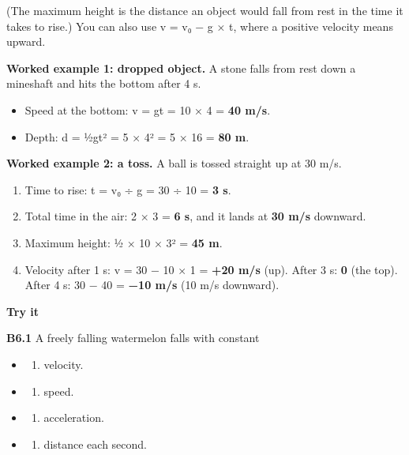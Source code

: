 \documentclass[
]{article}
\providecommand{\tightlist}{%
  \setlength{\itemsep}{0pt}\setlength{\parskip}{0pt}}
\begin{document}
(The maximum height is the distance an object would fall from rest in
the time it takes to rise.) You can also use v = v₀ − g × t, where a
positive velocity means upward.

\textbf{Worked example 1: dropped object.} A stone falls from rest down
a mineshaft and hits the bottom after 4 s.

\begin{itemize}
\tightlist
\item
  Speed at the bottom: v = gt = 10 × 4 = \textbf{40 m/s}.
\item
  Depth: d = ½gt² = 5 × 4² = 5 × 16 = \textbf{80 m}.
\end{itemize}

\textbf{Worked example 2: a toss.} A ball is tossed straight up at 30
m/s.

\begin{enumerate}
\def\labelenumi{\arabic{enumi}.}
\tightlist
\item
  Time to rise: t = v₀ ÷ g = 30 ÷ 10 = \textbf{3 s}.
\item
  Total time in the air: 2 × 3 = \textbf{6 s}, and it lands at
  \textbf{30 m/s} downward.
\item
  Maximum height: ½ × 10 × 3² = \textbf{45 m}.
\item
  Velocity after 1 s: v = 30 − 10 × 1 = \textbf{+20 m/s} (up). After 3
  s: \textbf{0} (the top). After 4 s: 30 − 40 = \textbf{−10 m/s} (10 m/s
  downward).
\end{enumerate}

\textbf{Try it}

\textbf{B6.1} A freely falling watermelon falls with constant

\begin{itemize}
\tightlist
\item
  \begin{enumerate}
  \def\labelenumi{\Alph{enumi})}
  \tightlist
  \item
    velocity.
  \end{enumerate}
\item
  \begin{enumerate}
  \def\labelenumi{\Alph{enumi})}
  \setcounter{enumi}{1}
  \tightlist
  \item
    speed.
  \end{enumerate}
\item
  \begin{enumerate}
  \def\labelenumi{\Alph{enumi})}
  \setcounter{enumi}{2}
  \tightlist
  \item
    acceleration.
  \end{enumerate}
\item
  \begin{enumerate}
  \def\labelenumi{\Alph{enumi})}
  \setcounter{enumi}{3}
  \tightlist
  \item
    distance each second.
  \end{enumerate}
\end{itemize}
\end{document}
